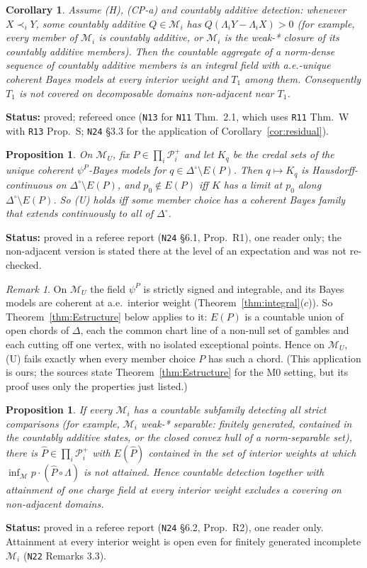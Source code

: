 \documentclass[11pt]{article}
\newtheorem{proposition}[theorem]{Proposition}
\newtheorem{corollary}[theorem]{Corollary}
\theoremstyle{definition}
\theoremstyle{remark}
\newtheorem{remark}[theorem]{Remark}
\newcommand{\Di}{\Delta^{\circ}}
\newcommand{\M}{\mathcal M}
\newcommand{\src}[1]{\texttt{#1}}
\newcommand{\status}[1]{\par\smallskip\noindent\textbf{Status:} #1\par\smallskip}
\begin{document}
\begin{corollary}\label{cor:DCA}
Assume (H), (CP-a) and countably additive detection: whenever $X\prec_iY$, some countably additive $Q\in\M_i$ has $Q(\Lambda_iY-\Lambda_iX)>0$ (for example, every member of $\M_i$ is countably additive, or $\M_i$ is the weak-* closure of its countably additive members). Then the countable aggregate of a norm-dense sequence of countably additive members is an integral field with a.e.-unique coherent Bayes models at every interior weight and $T_1$ among them. Consequently $T_1$ is not covered on decomposable domains non-adjacent near $T_1$.
\end{corollary}
\status{proved; refereed once (\src{N13} for \src{N11} Thm.~2.1, which uses \src{R11} Thm.~W with \src{R13} Prop.~S; \src{N24} \S3.3 for the application of Corollary~\ref{cor:residual}).}

\begin{proposition}\label{prop:Ucont}
On $\M_U$, fix $P\in\prod_i\mathcal P^+_i$ and let $K_q$ be the credal sets of the unique coherent $\psi^P$-Bayes models for $q\in\Di\setminus E(P)$. Then $q\mapsto K_q$ is Hausdorff-continuous on $\Di\setminus E(P)$, and $p_0\notin E(P)$ iff $K$ has a limit at $p_0$ along $\Di\setminus E(P)$. So (U) holds iff some member choice has a coherent Bayes family that extends continuously to all of $\Di$.
\end{proposition}
\status{proved in a referee report (\src{N24} \S6.1, Prop.~R1), one reader only; the non-adjacent version is stated there at the level of an expectation and was not re-checked.}

\begin{remark}\label{rem:EPchords}
On $\M_U$ the field $\psi^P$ is strictly signed and integrable, and its Bayes models are coherent at a.e.\ interior weight (Theorem~\ref{thm:integral}($c$)). So Theorem~\ref{thm:Estructure} below applies to it: $E(P)$ is a countable union of open chords of $\Delta$, each the common chart line of a non-null set of gambles and each cutting off one vertex, with no isolated exceptional points. Hence on $\M_U$, (U) fails exactly when every member choice $P$ has such a chord. (This application is ours; the sources state Theorem~\ref{thm:Estructure} for the M0 setting, but its proof uses only the properties just listed.)
\end{remark}

\begin{proposition}\label{prop:CD}
If every $\M_i$ has a countable subfamily detecting all strict comparisons (for example, $\M_i$ weak-* separable: finitely generated, contained in the countably additive states, or the closed convex hull of a norm-separable set), there is $\hat P\in\prod_i\mathcal P^+_i$ with $E(\hat P)$ contained in the set of interior weights at which $\inf_\M p\cdot(\hat P\circ\Lambda)$ is not attained. Hence countable detection together with attainment of one charge field at every interior weight excludes a covering on non-adjacent domains.
\end{proposition}
\status{proved in a referee report (\src{N24} \S6.2, Prop.~R2), one reader only. Attainment at every interior weight is open even for finitely generated incomplete $\M_i$ (\src{N22} Remarks 3.3).}
\end{document}
